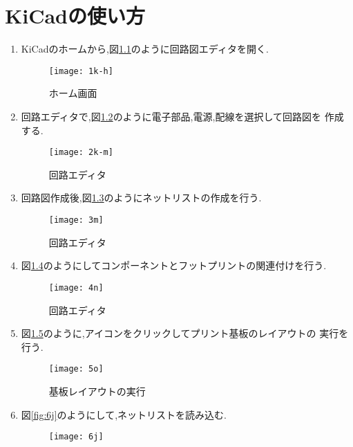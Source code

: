 \chapter{KiCadの使い方}
\begin{enumerate}
\item KiCadのホームから,図\ref{fig:1k-h}のように回路図エディタを開く.
\begin{figure}[H]
  \begin{center}
    \texttt{[image: 1k-h]}
    \end{center}
  \caption{ホーム画面}
 \label{fig:1k-h}
\end{figure}
\item 回路エディタで,図\ref{fig:2k-m}のように電子部品,電源,配線を選択して回路図を
作成する.
\begin{figure}[H]
  \begin{center}
    \texttt{[image: 2k-m]}
    \end{center}
  \caption{回路エディタ}
 \label{fig:2k-m}
\end{figure}
\item 回路図作成後,図\ref{fig:3m}のようにネットリストの作成を行う.
\begin{figure}[H]
  \begin{center}
    \texttt{[image: 3m]}
    \end{center}
  \caption{回路エディタ}
 \label{fig:3m}
\end{figure}
\item 図\ref{fig:4n}のようにしてコンポーネントとフットプリントの関連付けを行う.
\begin{figure}[H]
  \begin{center}
    \texttt{[image: 4n]}
    \end{center}
  \caption{回路エディタ}
 \label{fig:4n}
\end{figure}
\item 図\ref{fig:5o}のように,アイコンをクリックしてプリント基板のレイアウトの
実行を行う.
\begin{figure}[H]
  \begin{center}
    \texttt{[image: 5o]}
    \end{center}
  \caption{基板レイアウトの実行}
 \label{fig:5o}
\end{figure}
\item 図\ref{fig:6j}のようにして,ネットリストを読み込む.
\begin{figure}[H]
  \begin{center}
    \texttt{[image: 6j]}

\end{center}
\end{figure}
\end{enumerate}
